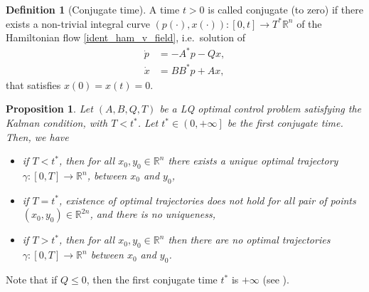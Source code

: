 \documentclass[reqno]{amsart}
\theoremstyle{plain}
\newtheorem{prop}[thm]{Proposition}
\theoremstyle{definition}
\newtheorem{Def}[thm]{Definition}
\theoremstyle{remark}
\begin{document}


\begin{Def}[Conjugate time]
  A time $t>0$ is called conjugate (to zero) if there exists a non-trivial integral curve $(p(\cdot),x(\cdot)):\left[0,t\right]\to T^*\mathbb{R}^n$ of the Hamiltonian flow \eqref{ident_ham_v_field}, i.e.\ solution of
		\begin{align}
			\dot{p}& =-A^*p-Qx,\\
			\dot{x}& =BB^*p+Ax,
		\end{align}
		that satisfies $x(0)=x(t)=0$. 
			
\end{Def}

\begin{prop}\label{corollary_LQ_optimal_trajectories}
			 Let $(A,B,Q,T)$ be a LQ optimal control problem satisfying the Kalman condition, with $T<t^*$. Let $t^*\in\left(0,+\infty\right]$ be the first conjugate time. Then, we have 
			\begin{itemize}
				\item if $T<t^*$, then for all $x_0,y_0 \in \mathbb{R}^n$ there exists a unique optimal trajectory $\gamma:[0,T]\to \mathbb{R}^n$, between $x_0$ and $y_0$,
				\item if $T=t^*$, existence of optimal trajectories does not hold for all pair of points $(x_0,y_0)\in\mathbb{R}^{2n}$, and there is no uniqueness, 
				\item if $T>t^*$, then for all $x_0,y_0 \in \mathbb{R}^n$ then there are no optimal trajectories $\gamma:[0,T]\to \mathbb{R}^n$ between $x_0$ and $y_0$.  
			\end{itemize}
\end{prop}

        Note that if $Q\leq 0$, then the first conjugate time $t^*$ is $+\infty$ (see \cite{hinpomriff2011}).
            
\end{document}
